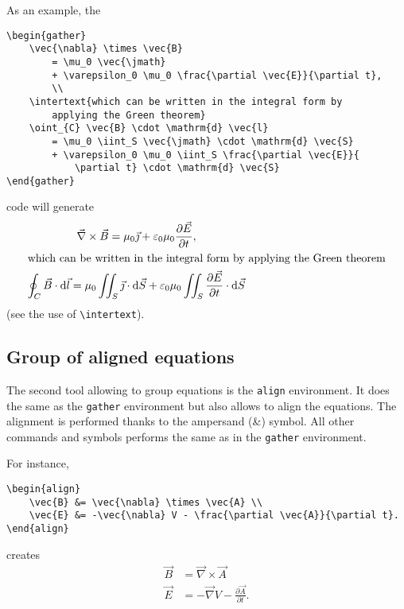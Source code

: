 		
		As an example, the	
\begin{lstlisting}[language={[LaTeX]TeX}]
\begin{gather}
	\vec{\nabla} \times \vec{B}
		= \mu_0 \vec{\jmath}
		+ \varepsilon_0 \mu_0 \frac{\partial \vec{E}}{\partial t},
		\\
	\intertext{which can be written in the integral form by 
		applying the Green theorem}
	\oint_{C} \vec{B} \cdot \mathrm{d} \vec{l}
		= \mu_0 \iint_S \vec{\jmath} \cdot \mathrm{d} \vec{S}
		+ \varepsilon_0 \mu_0 \iint_S \frac{\partial \vec{E}}{
			\partial t}	\cdot \mathrm{d} \vec{S}
\end{gather}
\end{lstlisting}	
		code will generate
		\begin{gather}
			\vec{\nabla} \times \vec{B}
				= \mu_0 \vec{\jmath}
				+ \varepsilon_0 \mu_0 \frac{\partial \vec{E}}{\partial t},
				\\
			\intertext{which can be written in the integral form by applying the Green theorem}
			\oint_{C} \vec{B} \cdot \mathrm{d} \vec{l}
				= \mu_0 \iint_S \vec{\jmath} \cdot \mathrm{d} \vec{S}
				+ \varepsilon_0 \mu_0 \iint_S \frac{\partial \vec{E}}{\partial t} \cdot \mathrm{d} \vec{S}
		\end{gather}
		(see the use of \texttt{\textbackslash{}intertext}).
	
	
	
	\subsection{Group of aligned equations}
	
	
		The second tool allowing to group equations is the \texttt{align} environment.
		It does the same as the \texttt{gather} environment but also allows to align the equations.
		The alignment is performed thanks to the ampersand (\&) symbol.
		All other commands and symbols performs the same as in the \texttt{gather} environment.
		
		
		For instance,
\begin{lstlisting}[language={[LaTeX]TeX}]
\begin{align}
	\vec{B} &= \vec{\nabla} \times \vec{A} \\
	\vec{E} &= -\vec{\nabla} V - \frac{\partial \vec{A}}{\partial t}.
\end{align}
\end{lstlisting}
		creates
		\begin{align}
			\vec{B} &= \vec{\nabla} \times \vec{A} \\
			\vec{E} &= -\vec{\nabla} V - \frac{\partial \vec{A}}{\partial t}.
		\end{align}
	
